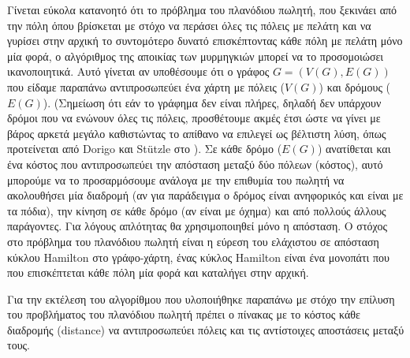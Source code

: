 Γίνεται εύκολα κατανοητό ότι το πρόβλημα του πλανόδιου πωλητή, που ξεκινάει από την πόλη όπου βρίσκεται με στόχο να περάσει όλες τις πόλεις με πελάτη και να γυρίσει στην αρχική το συντομότερο δυνατό επισκέπτοντας κάθε πόλη με πελάτη μόνο μία φορά, ο αλγόριθμος της αποικίας των μυρμηγκιών μπορεί να το προσομοιώσει ικανοποιητικά. 
Αυτό γίνεται αν υποθέσουμε ότι ο γράφος $G=(V(G), E(G))$  που είδαμε παραπάνω αντιπροσωπεύει ένα χάρτη με πόλεις ($V(G)$) και δρόμους ($E(G)$). (Σημείωση ότι εάν το γράφημα δεν είναι πλήρες, δηλαδή δεν υπάρχουν δρόμοι που να ενώνουν όλες τις πόλεις, προσθέτουμε ακμές έτσι ώστε να γίνει με βάρος αρκετά μεγάλο καθιστώντας το απίθανο να επιλεγεί ως βέλτιστη λύση, όπως προτείνεται από Dorigo και Stützle στο \cite{dorigo2004ant}). Σε κάθε δρόμο ($E(G)$) ανατίθεται και ένα κόστος που αντιπροσωπεύει την απόσταση μεταξύ δύο πόλεων (κόστος), αυτό μπορούμε να το προσαρμόσουμε ανάλογα με την επιθυμία του πωλητή να ακολουθήσει μία διαδρομή (αν για παράδειγμα ο δρόμος είναι ανηφορικός και είναι με τα πόδια), την κίνηση σε κάθε δρόμο (αν είναι με όχημα) και από πολλούς άλλους παράγοντες. Για λόγους απλότητας θα χρησιμοποιηθεί μόνο η απόσταση. Ο στόχος στο πρόβλημα του πλανόδιου πωλητή είναι η εύρεση του ελάχιστου σε απόσταση κύκλου Hamilton στο γράφο-χάρτη, ένας κύκλος Hamilton είναι ένα μονοπάτι που που επισκέπτεται κάθε πόλη μία φορά και καταλήγει στην αρχική. \cite{dorigo2004ant}

Για την εκτέλεση του αλγορίθμου που υλοποιήθηκε παραπάνω με στόχο την επίλυση του προβλήματος του πλανόδιου πωλητή πρέπει ο πίνακας με το κόστος κάθε διαδρομής (distance) να αντιπροσωπεύει πόλεις και τις αντίστοιχες αποστάσεις μεταξύ τους. 






